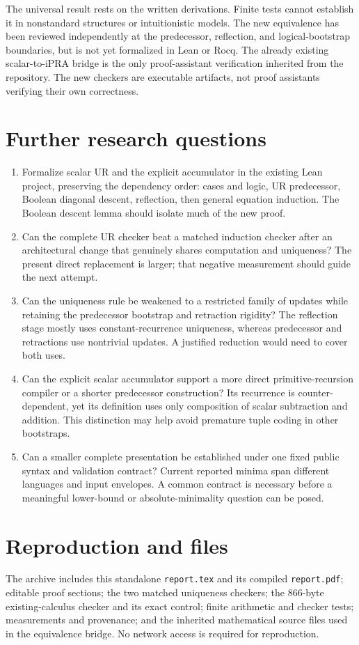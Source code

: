 \documentclass[11pt]{article}
\theoremstyle{definition}\newtheorem{definition}[theorem]{Definition}
\newcommand{\file}[1]{{\small\nolinkurl{#1}}}
\begin{document}
The universal result rests on the written derivations.  Finite tests
cannot establish it in nonstandard structures or intuitionistic models.
The new equivalence has been reviewed independently at the predecessor,
reflection, and logical-bootstrap boundaries, but is not yet formalized
in Lean or Rocq.  The already existing scalar-to-iPRA bridge is the only
proof-assistant verification inherited from the repository.  The new
checkers are executable artifacts, not proof assistants verifying their
own correctness.

\section{Further research questions}
\begin{enumerate}[leftmargin=*]
\item Formalize scalar UR and the explicit accumulator in the existing Lean
project, preserving the dependency order: cases and logic, UR predecessor,
Boolean diagonal descent, reflection, then general equation induction.
The Boolean descent lemma should isolate much of the new proof.
\item Can the complete UR checker beat a matched induction checker after
an architectural change that genuinely shares computation and uniqueness?
The present direct replacement is larger; that negative measurement should
guide the next attempt.
\item Can the uniqueness rule be weakened to a restricted family of
updates while retaining the predecessor bootstrap and retraction rigidity?
The reflection stage mostly uses constant-recurrence uniqueness, whereas
predecessor and retractions use nontrivial updates.  A justified reduction
would need to cover both uses.
\item Can the explicit scalar accumulator support a more direct
primitive-recursion compiler or a shorter predecessor construction?
Its recurrence is counter-dependent, yet its definition uses only
composition of scalar subtraction and addition.  This distinction may
help avoid premature tuple coding in other bootstraps.
\item Can a smaller complete presentation be established under one fixed
public syntax and validation contract?  Current reported minima span
different languages and input envelopes.  A common contract is necessary
before a meaningful lower-bound or absolute-minimality question can be
posed.
\end{enumerate}

\section{Reproduction and files}
The archive includes this standalone \file{report.tex} and its compiled
\file{report.pdf}; editable proof sections; the two matched uniqueness
checkers; the 866-byte existing-calculus checker and its exact control;
finite arithmetic and checker tests; measurements and provenance; and
the inherited mathematical source files used in the equivalence bridge.
No network access is required for reproduction.
\end{document}

